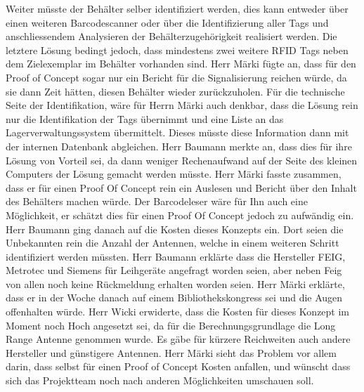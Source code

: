 \documentclass[parskip=full, a4paper]{scrreprt}
\begin{document}
Weiter müsste der Behälter selber identifiziert werden, dies kann entweder über einen weiteren Barcodescanner oder über die Identifizierung aller Tags und anschliessendem Analysieren der Behälterzugehörigkeit realisiert werden. Die letztere Lösung bedingt jedoch, dass mindestens zwei weitere RFID Tags neben dem Zielexemplar im Behälter vorhanden sind.
Herr Märki fügte an, dass für den Proof of Concept sogar nur ein Bericht für die Signalisierung reichen würde, da sie dann Zeit hätten, diesen Behälter wieder zurückzuholen. Für die technische Seite der Identifikation, wäre für Herrn Märki auch denkbar, dass die Lösung rein nur die Identifikation der Tags übernimmt und eine Liste an das Lagerverwaltungssystem übermittelt. Dieses müsste diese Information dann mit der internen Datenbank abgleichen. Herr Baumann merkte an, dass dies für ihre Lösung von Vorteil sei, da dann weniger Rechenaufwand auf der Seite des kleinen Computers der Lösung gemacht werden müsste. Herr Märki fasste zusammen, dass er für einen Proof Of Concept rein ein Auslesen und Bericht über den Inhalt des Behälters machen würde. Der Barcodeleser wäre für Ihn auch eine Möglichkeit, er schätzt dies für einen Proof Of Concept jedoch zu aufwändig ein.
Herr Baumann ging danach auf die Kosten dieses Konzepts ein. Dort seien die Unbekannten rein die Anzahl der Antennen, welche in einem weiteren Schritt identifiziert werden müssten.
Herr Baumann erklärte dass die Hersteller FEIG, Metrotec und Siemens für Leihgeräte angefragt worden seien, aber neben Feig von allen noch keine Rückmeldung erhalten worden seien. Herr Märki erklärte, dass er in der Woche danach auf einem Bibliothekskongress sei und die Augen offenhalten würde.
Herr Wicki erwiderte, dass die Kosten für dieses Konzept im Moment noch Hoch angesetzt sei, da für die Berechnungsgrundlage die Long Range Antenne genommen wurde. Es gäbe für kürzere Reichweiten auch andere Hersteller und günstigere Antennen. Herr Märki sieht das Problem vor allem darin, dass selbst für einen Proof of Concept Kosten anfallen, und wünscht dass sich das Projektteam noch nach anderen Möglichkeiten umschauen soll.
\end{document}
